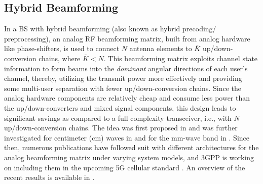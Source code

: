 \documentclass[journal,comsoc]{IEEEtran}
\begin{document}
\subsection{Hybrid Beamforming} \label{subsec_hybrid_preprocessing}
%
In a BS with hybrid beamforming (also known as hybrid precoding/ preprocessing), an analog RF beamforming matrix, built from analog hardware like phase-shifters, is used to connect $N$ antenna elements to $\bar{K}$ up/down-conversion chains, where $\bar{K} < N$. This beamforming matrix exploits channel state information to form beams into the \emph{dominant} angular directions of each user's channel, thereby, utilizing the transmit power more effectively and providing some multi-user separation with fewer up/down-conversion chains. Since the analog hardware components are relatively cheap and consume less power than the up/down-converters and mixed signal components, this design leads to significant savings as compared to a full complexity transceiver, i.e., with $N$ up/down-conversion chains. 
%
The idea was first proposed in \cite{Molisch_VarPhaseShift, Sudarshan} and was further investigated for centimeter (cm) waves in \cite{Karamalis2006, venkateswaran2010analog} and for the mm-wave band in \cite{Ayach2012, Alkhateeb2013, Ayach_iCSI, Alkhateeb2014, Adhikary_JSDM, Alkhateeb2015}. Since then, numerous publications have followed suit with different architectures for the analog beamforming matrix under varying system models, and 3GPP is working on including them in the upcoming 5G cellular standard \cite{Docomo_3gpp_meeting}. An overview of the recent results is available in \cite{Alkhateeb2014_mag, Heath2016, Molisch_HP_mag}. 
\end{document}
